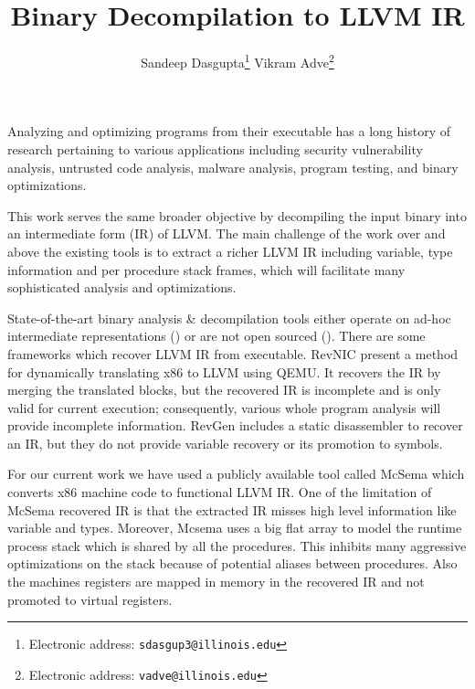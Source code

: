 \documentclass[10pt,twoside]{article}
\date{}
\title{\textbf{ Binary Decompilation to LLVM IR}}
\author{Sandeep Dasgupta\thanks{Electronic address: \texttt{sdasgup3@illinois.edu}}
\qquad Vikram Adve\thanks{Electronic address: \texttt{vadve@illinois.edu}}
}
\begin{document}
\thispagestyle{empty}

\maketitle

Analyzing and optimizing programs from their executable has a long history of
research pertaining to various applications including  security vulnerability
analysis, untrusted code analysis, malware analysis, program testing, and
binary optimizations. 

This work serves the same broader objective by decompiling the input binary
into an intermediate form (IR) of LLVM.  The main challenge of the work over
and above the existing tools is to extract a richer LLVM IR  including
variable, type information and per procedure stack frames, which
will facilitate many sophisticated analysis and optimizations.

State-of-the-art binary analysis \& decompilation tools either operate on
ad-hoc intermediate representations (\cite{HexRays, Codesurfer, BAP}) or are
not open sourced (\cite{HexRays, Codesurfer, BAP,SECONDWRITE-EUROSYS-2013,
DIVINE-VMCAI-2007,POLYTYPEINFERENCE-PLDI-2016}).  There are some frameworks
which recover LLVM IR from executable.  RevNIC \cite{REVNIC-EUROSYS-2010}
present a method for dynamically translating x86 to LLVM using
QEMU\cite{QEMU-ATEC-2005}.  It recovers the IR by merging the translated
blocks, but the recovered IR is incomplete and is only valid for current
execution; consequently, various whole program analysis will provide incomplete
information. RevGen \cite{REVGEN-DNSW-2011} includes a static disassembler to
recover an IR, but they do not provide variable recovery or its promotion to
symbols.
  

For our current work we have used a publicly available tool called McSema
\cite{Mcsema}  which converts x86 machine code to functional LLVM IR.  
One of the limitation of McSema recovered IR is that the
extracted IR misses high level information like variable and types.  Moreover,
Mcsema uses a big flat array to model the runtime process stack which is shared
by all the procedures. This inhibits many aggressive optimizations on the stack
because of potential aliases between procedures. Also the machines
registers are mapped in memory in the recovered IR and not promoted to virtual
registers. 
\end{document}
